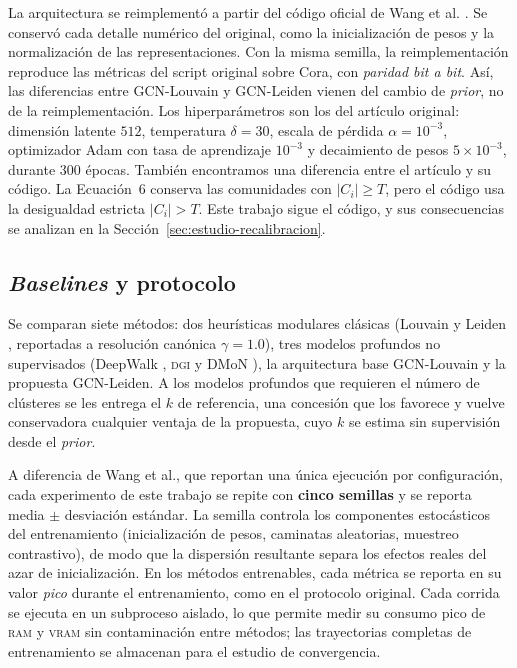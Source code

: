 \documentclass[twoside,twocolumn,10pt]{article}
\begin{document}
La arquitectura se reimplementó a partir del código oficial de Wang et al. \cite{Wang2025}. Se conservó cada detalle numérico del original, como la inicialización de pesos y la normalización de las representaciones. Con la misma semilla, la reimplementación reproduce las métricas del script original sobre Cora, con \emph{paridad bit a bit}. Así, las diferencias entre GCN-Louvain y GCN-Leiden vienen del cambio de \textit{prior}, no de la reimplementación. Los hiperparámetros son los del artículo original: dimensión latente $512$, temperatura $\delta = 30$, escala de pérdida $\alpha = 10^{-3}$, optimizador Adam con tasa de aprendizaje $10^{-3}$ y decaimiento de pesos $5 \times 10^{-3}$, durante $300$ épocas. También encontramos una diferencia entre el artículo y su código. La Ecuación~6 conserva las comunidades con $|C_i| \geq T$, pero el código usa la desigualdad estricta $|C_i| > T$. Este trabajo sigue el código, y sus consecuencias se analizan en la Sección~\ref{sec:estudio-recalibracion}.

\subsection{\textit{Baselines} y protocolo}
\label{subsec:lineas-base-protocolo}

Se comparan siete métodos: dos heurísticas modulares clásicas (Louvain \cite{blondel2008} y Leiden \cite{Traag2019}, reportadas a resolución canónica $\gamma=1.0$), tres modelos profundos no supervisados (DeepWalk \cite{Perozzi2014}, \textsc{dgi} \cite{Velickovic2019} y DMoN \cite{tsitsulin2023}), la arquitectura base GCN-Louvain \cite{Wang2025} y la propuesta GCN-Leiden. A los modelos profundos que requieren el número de clústeres se les entrega el $k$ de referencia, una concesión que los favorece y vuelve conservadora cualquier ventaja de la propuesta, cuyo $k$ se estima sin supervisión desde el \textit{prior}.

A diferencia de Wang et al., que reportan una única ejecución por configuración, cada experimento de este trabajo se repite con \textbf{cinco semillas} y se reporta media $\pm$ desviación estándar. La semilla controla los componentes estocásticos del entrenamiento (inicialización de pesos, caminatas aleatorias, muestreo contrastivo), de modo que la dispersión resultante separa los efectos reales del azar de inicialización. En los métodos entrenables, cada métrica se reporta en su valor \emph{pico} durante el entrenamiento, como en el protocolo original. Cada corrida se ejecuta en un subproceso aislado, lo que permite medir su consumo pico de \textsc{ram} y \textsc{vram} sin contaminación entre métodos; las trayectorias completas de entrenamiento se almacenan para el estudio de convergencia.
\end{document}
